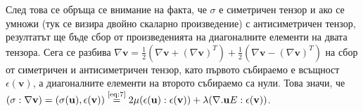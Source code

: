 \documentclass{report}
\begin{document}
	След това се обръща се внимание на факта, че $\sigma$ е симетричен тензор и ако се умножи (тук се визира двойно скаларно произведение) с антисиметричен тензор, резултатът ще бъде сбор от произведенията на диагоналните елементи на двата тензора. Сега се разбива $\displaystyle \nabla \mathbf{v}=\frac{1}{2}(\nabla \mathbf{v} + (\nabla \mathbf{v})^T) + \frac{1}{2}(\nabla \mathbf{v} - (\nabla \mathbf{v})^T)$ на сбор от симетричен и антисиметричен тензор, като първото събираемо е всъщност $\epsilon(\mathbf{v})$, а диагоналните елементи на второто събираемо са нули. Това значи, че $(\sigma : \nabla \mathbf{v}) = (\sigma(\mathbf{u}), \epsilon(\mathbf{v}))  \overset{\text{\ref{eq:7}}}{=}2\mu (\epsilon(\mathbf{u}):\epsilon(\mathbf{v}))+\lambda (\nabla . \mathbf{u} E: \epsilon(\mathbf{v}))$. 
	
\end{document}
